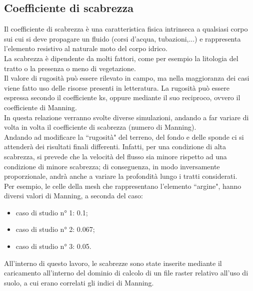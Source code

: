 \subsection{Coefficiente di scabrezza}
Il coefficiente di scabrezza è una caratteristica fisica intrinseca a qualsiasi corpo sui cui si deve propagare un fluido (corsi d'acqua, tubazioni,...) e rappresenta l'elemento resistivo al naturale moto del corpo idrico.\\
La scabrezza è dipendente da molti fattori, come per esempio la litologia del tratto o la presenza o meno di vegetazione.\\
Il valore di rugosità può essere rilevato in campo, ma nella maggioranza dei casi viene fatto uso delle risorse presenti in letteratura. La rugosità può essere espressa secondo il coefficiente ks, oppure mediante il suo reciproco, ovvero il coefficiente di Manning.\\
In questa relazione verranno svolte diverse simulazioni, andando a far variare di volta in volta il coefficiente di scabrezza (numero di Manning).\\
Andando ad modificare la ``rugosità" del terreno, del fondo e delle sponde ci si attenderà dei risultati finali differenti. Infatti, per una condizione di alta scabrezza, si prevede che la velocità del flusso sia minore rispetto ad una condizione di minore scabrezza; di conseguenza, in modo inversamente proporzionale, andrà anche a variare la profondità lungo i tratti considerati.\\
Per esempio, le celle della mesh che rappresentano l'elemento ``argine", hanno diversi valori di Manning, a seconda del caso:
\begin{itemize}
    \item caso di studio n° 1: 0.1;
    \item caso di studio n° 2: 0.067;
    \item caso di studio n° 3: 0.05.
\end{itemize}
All'interno di questo lavoro, le scabrezze sono state inserite mediante il caricamento all'interno del dominio di calcolo di un file raster relativo all'uso di suolo, a cui erano correlati gli indici di Manning.

